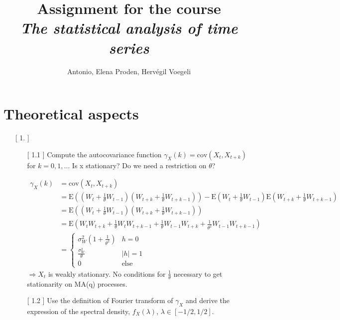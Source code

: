 \documentclass[10pt,a4paper]{article}
\author{ Antonio, Elena Proden, Hervégil Voegeli}
\title{Assignment for the course \\ \textit{The statistical analysis of time series}}
\begin{document}
	\maketitle
	\newpage
	\section{Theoretical aspects}
	\begin{enumerate}
	\item[[ 1.]] \begin{enumerate}
			\item[[ 1.1]] Compute the autocovariance function $\gamma_{X} (k) = \text{cov}(X_t,X_{t+k})$ for $k=0,1,\dots$ Is { \selectfont \large  x } stationary? Do we need a restriction on $\theta$?
			
			\begin{align*}
				\gamma_{X}(k) &= \text{cov}(X_t,X_{t+k}) \\
				&= \text{E}((W_t+\frac{1}{\theta} W_{t-1})(W_{t+k}+\frac{1}{\theta}W_{t+k-1})) - \text{E}(W_t+\frac{1}{\theta} W_{t-1})\text{E}(W_{t+k}+\frac{1}{\theta}W_{t+k-1}) \\
				&= \text{E}((W_t+\frac{1}{\theta} W_{t-1})(W_{t+k}+\frac{1}{\theta}W_{t+k-1})) \\
				&= \text{E}(W_tW_{t+k} + \frac{1}{\theta} W_tW_{t+k-1}+\frac{1}{\theta} W_{t-1}W_{t+k} + \frac{1}{\theta^2} W_{t-1}W_{t+k-1}) \\
				&= 	\left\{
							\begin{array}{ll}
								\sigma^2_{W} (1+\frac{1}{\theta^2}) & h=0\\
								\frac{\sigma^2_{W}}{\theta} & |h|=1\\
								0 & \text{else}
							\end{array}
					\right.			
			\end{align*}		
			$\Rightarrow X_{t}$ is weakly stationary. No conditions for $\frac{1}{\theta}$ necessary to get stationarity on MA(q) processes. 
			
			
			
			\item[[ 1.2]] Use the definition of Fourier transform of $\gamma_X$ and derive the expression of the spectral density, $f_X(\lambda)$, $\lambda \in \left[-1/2,1/2\right]$.
			

\end{enumerate}
\end{enumerate}
\end{document}
